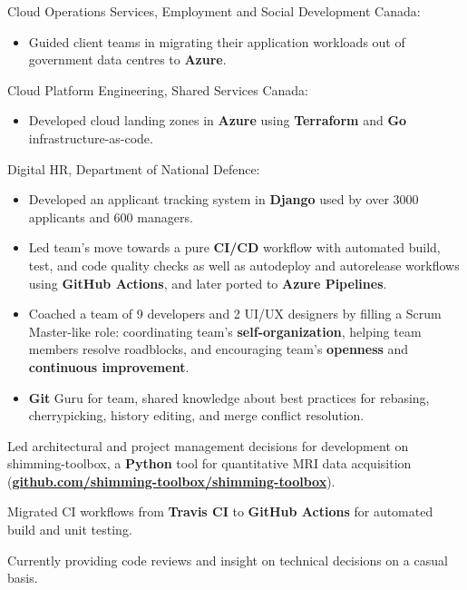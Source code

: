 \documentclass[]{jidicula-resume}
\begin{document}
\vspace{\topsep} %
\begin{tightemize}
\item Cloud Operations Services, Employment and Social Development Canada:
  \begin{itemize}
  \item Guided client teams in migrating their application workloads out of government data centres to \textbf{Azure}.
  \end{itemize}
\item Cloud Platform Engineering, Shared Services Canada:
  \begin{itemize}
  \item Developed cloud landing zones in \textbf{Azure} using \textbf{Terraform} and \textbf{Go} infrastructure-as-code.
  \end{itemize}
\item Digital HR, Department of National Defence:
  \begin{itemize}
  \item Developed an applicant tracking system in \textbf{Django} used by over 3000 applicants and 600 managers.
  \item Led team's move towards a pure \textbf{CI/CD} workflow with automated build, test, and code quality checks as well as autodeploy and autorelease workflows using \textbf{GitHub Actions}, and later ported to \textbf{Azure Pipelines}.
  \item Coached a team of 9 developers and 2 UI/UX designers by filling a Scrum Master-like role: coordinating team's \textbf{self-organization}, helping team members resolve roadblocks, and encouraging team's \textbf{openness} and \textbf{continuous improvement}.
  \item \textbf{Git} Guru for team, shared knowledge about best practices for rebasing, cherrypicking, history editing, and merge conflict resolution.
  \end{itemize}
\end{tightemize}
\sectionsep{}

\vspace{\topsep} %
\begin{tightemize}
\item Led architectural and project management decisions for development on shimming-toolbox, a \textbf{Python} tool for quantitative MRI data acquisition (\href{https://github.com/shimming-toolbox/shimming-toolbox}{\bf github.com/shimming-toolbox/shimming-toolbox}).
\item Migrated CI workflows from \textbf{Travis CI} to \textbf{GitHub Actions} for automated build and unit testing.
\item Currently providing code reviews and insight on technical decisions on a casual basis.
\end{tightemize}
\sectionsep{}
\end{document}
